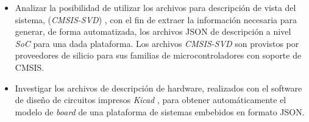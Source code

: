 
\begin{itemize}
\item
Analizar la posibilidad de utilizar los archivos para descripción de vista del sistema, (\emph{CMSIS-SVD}) \citep{CMSISSVD}, con el fin de extraer la información necesaria para generar, de forma automatizada, los archivos JSON de descripción a nivel \emph{SoC} para una dada plataforma. Los archivos \emph{CMSIS-SVD} son provistos por proveedores de silicio para sus familias de microcontroladores con soporte de CMSIS.
\item
Investigar los archivos de descripción de hardware, realizados con el software de diseño de circuitos impresos \emph{Kicad} \citep{Kicad}, para obtener automáticamente el modelo de \emph{board} de una plataforma de sistemas embebidos en formato JSON.
\end{itemize}
